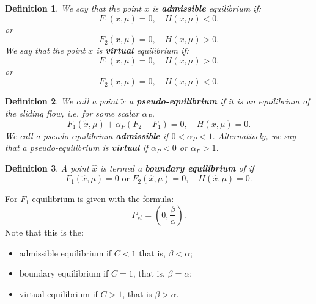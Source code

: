 \documentclass[12pt,a4paper]{article}
\newtheorem{definition}{Definition}
\begin{document}
\begin{definition}\cite{bernardo2008piecewise}
    We say that the point $x$ is \textbf{admissible} equilibrium if:
    \begin{equation}
        F_1(x, \mu) = 0, \quad H(x, \mu) < 0.
    \end{equation}
or 
    \begin{equation}
        F_2(x, \mu) = 0, \quad H(x, \mu) > 0.
    \end{equation}
We say that the point $x$ is \textbf{virtual} equilibrium if:
    \begin{equation}
        F_1(x, \mu) = 0, \quad H(x, \mu) > 0.
    \end{equation}
or 
    \begin{equation}
        F_2(x, \mu) = 0, \quad H(x, \mu) < 0.
    \end{equation}
\end{definition}
\begin{definition}\cite{bernardo2008piecewise}
    We call a point $\tilde{x}$ a \textbf{pseudo-equilibrium} if it is an equilibrium of the sliding flow, i.e. for some scalar $\alpha_P$,
    \begin{equation}
        F_1(\tilde{x}, \mu) + \alpha_P (F_2 - F_1) = 0, \quad H(\tilde{x}, \mu) = 0.
    \end{equation}
    We call a pseudo-equilibrium \textbf{admissible} if $0 < \alpha_P < 1.$
Alternatively, we say that a pseudo-equilibrium is \textbf{virtual} if
$\alpha_P < 0$ or $\alpha_P > 1$.
\end{definition}
\begin{definition}\cite{bernardo2008piecewise}A point $\hat{x}$ is termed a \textbf{boundary equilibrium} of if
\begin{equation}
    F_1(\hat{x}, \mu)=0 \text{ or } F_2(\hat{x}, \mu)=0, \quad H(\hat{x}, \mu)=0.
\end{equation}   
\end{definition}
\noindent For $F_1$ equilibrium is given with the formula:
\begin{equation}\label{eqn:critical_point_minus}
    P_{st}^{-} = \left(0, \frac{\beta}{\alpha}\right).
\end{equation}
Note that this is the:
\begin{itemize}
    \item admissible equilibrium if $C<1$ that is, $\beta < \alpha$;
    \item boundary equilibrium if $C=1$, that is, $\beta=\alpha$;
    \item virtual equilibrium if $C>1$, that is $\beta > \alpha.$
\end{itemize}
\end{document}
